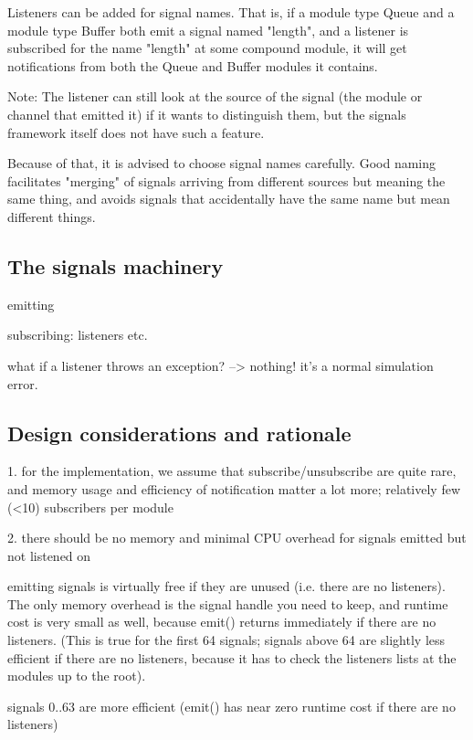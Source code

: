 Listeners can be added for signal names. That is, if a module type Queue
and a module type Buffer both emit a signal named "length", and a listener
is subscribed for the name "length" at some compound module, it will get
notifications from both the Queue and Buffer modules it contains.

Note: The listener can still look at the source of the signal (the module or
channel that emitted it) if it wants to distinguish them, but the
signals framework itself does not have such a feature.

Because of that, it is advised to choose signal names carefully. Good naming
facilitates "merging" of signals arriving from different sources but
meaning the same thing, and avoids signals that accidentally have
the same name but mean different things.



\subsection{The signals machinery}
\label{sec:simple-modules:signals-api}

emitting

subscribing: listeners etc.

what if a listener throws an exception? --> nothing! it's a normal simulation error.



\subsection{Design considerations and rationale}

1. for the implementation, we assume that subscribe/unsubscribe are quite rare,
and memory usage and efficiency of notification matter a lot more;
relatively few (<10) subscribers per module

2. there should be no memory and minimal CPU overhead for signals emitted but not listened on

emitting signals is virtually free if they are unused (i.e. there are
no listeners). The only memory overhead is the signal handle you need
to keep, and runtime cost is very small as well, because emit()
returns immediately if there are no listeners. (This is true for the
first 64 signals; signals above 64 are slightly less efficient if there
are no listeners, because it has to check the listeners lists at
the modules up to the root).

signals 0..63 are more efficient (emit() has near zero runtime cost if there
are no listeners)

